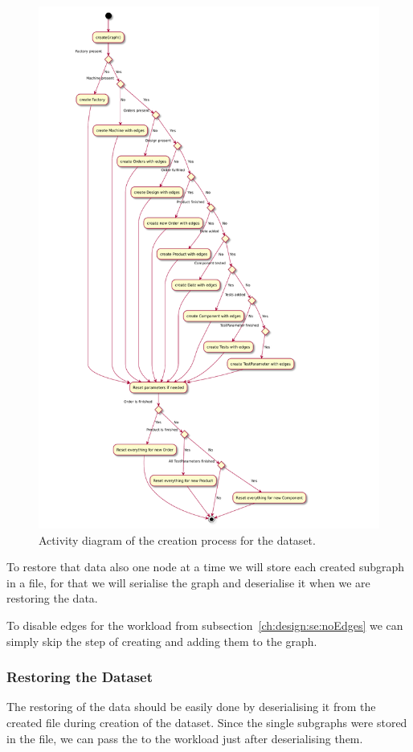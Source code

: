 \begin{figure}
  \includegraphics[width=\textwidth/2]{images/dataCreation}
  \caption{Activity diagram of the creation process for the dataset.}
  \label{fig:dataCreation}
\end{figure}


To restore that data also one node at a time we will store each created subgraph in a file,
for that we will serialise the graph and deserialise it when we are restoring the data.

To disable edges for the workload from subsection~\ref{ch:design:se:noEdges} we can simply skip the step of creating and adding them to the graph.

\subsubsection{Restoring the Dataset}
\label{ch:design:se:restoringTheDataset}
The restoring of the data should be easily done by deserialising it from the created file during creation of the dataset.
Since the single subgraphs were stored in the file,
we can pass the to the workload just after deserialising them.


